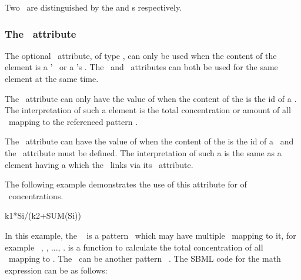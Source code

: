 
Two  \species\ are distinguished by the  and  \speciesReference s respectively. 

\subsubsection{The \representationTypeAtt\ attribute}
\label{def:Reaction:Math:ci:representationType}

The optional \representationTypeAtt\ attribute, of type \RepresentationTypePTWC, can only be used when the content of the  element is a \species' \idAtt\ or a \possibleSpeciesFeatureValue's \idAtt. The \representationTypeAtt\ and \speciesReferenceAtt\ attributes can both be used for the same  element at the same time. 

The \representationTypeAtt\ attribute can only have the value of  when the content of the  is the id of a \species. The interpretation of such a  element is the total concentration or amount of all \fullydefinedspeciesWC\ mapping to the referenced pattern \species.   

The \representationTypeAtt\ attribute can have the value of  when the content of the  is the id of a \possibleSpeciesFeatureValue\ and the \speciesReferenceAtt\ attribute must be defined. The interpretation of such a  is the same as a  element having a  which the \possibleSpeciesFeatureValue\ links via its \numericValueAtt\ attribute.   

The following example demonstrates the use of this attribute for  of \species\ concentrations.

\begin{example}[style=latex]
    k1*Si/(k2+SUM(Si)) 
\end{example}

In this example, the \reactant\  is a pattern \species\ which may have multiple \fullydefinedspecies\ mapping to it, for example \species\ , , ..., .   is a function to calculate the total concentration of all \fullydefinedspecies\ mapping to . The \product\ can be another pattern \species\ . The SBML code for the math expression can be as follows:


